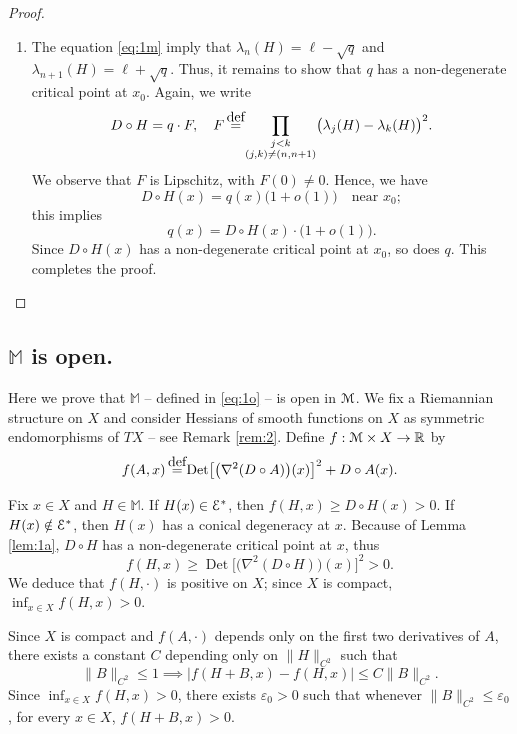 \documentclass[11pt]{article}
\numberwithin{equation}{section}
\let\pazocal\EuScript
\theoremstyle{definition}
\DeclareMathOperator{\Det}{Det}
\newcommand{\EE}{\pazocal{E}}
\newcommand{\MM}{\pazocal{M}}
\newcommand{\R}{\mathbb{R}}
\newcommand{\Mm}{\mathbb{M}}
\let\epsi\varepsilon
\newcommand{\de}{\,\mathrel{\stackrel{\makebox[0pt]{\mbox{\normalfont\tiny def}}}{=}}}
\begin{document}
\begin{proof}
\begin{enumerate}
\item
The equation \eqref{eq:1m} imply that $\lambda_n(H) = \ell - \sqrt{q}$ and $\lambda_{n+1}(H) = \ell + \sqrt{q}$. Thus, it remains to show that $q$ has a non-degenerate critical point at $x_0$. Again, we write
\begin{equation*}
D \circ H = q \cdot F, \quad F \de \prod_{\substack{j < k \\ (j,k) \neq (n,n+1)}} \bigl(\lambda_j(H)-\lambda_k(H)\bigr)^2.
\end{equation*}
We observe that $F$ is Lipschitz, with $F(0) \neq 0$. Hence, we have
\[
D \circ H(x) = q(x) \bigl(1 + o(1)\bigr)\quad \text{near }x_0;
\]
this implies
\begin{equation*}
q(x) = D \circ H(x) \cdot \bigl( 1 + o(1) \bigr).
\end{equation*}
Since $D \circ H(x)$ has a non-degenerate critical point at $x_0$, so does $q$. This completes the proof.\qedhere
\end{enumerate}
\end{proof}

\subsection{$\Mm$ is open.}\label{sec:2.2} Here we prove that $\Mm$ -- defined in \eqref{eq:1o} -- is open in $\MM$. We fix a Riemannian structure on $X$ and consider Hessians of smooth functions on $X$ as symmetric endomorphisms of $TX$ -- see Remark \ref{rem:2}. Define $f : \MM \times X \to \R$ by
\begin{equation}\label{eq:0j}
f(A,x) \de \Det\bigl[ \bigl(\nabla^2 (D\circ A)\bigr)(x) \bigr]^2 + D \circ A(x).
\end{equation}

Fix $x \in X$ and $H \in \Mm$. If $H(x) \in \EE^*$, then $f(H,x) \geq D \circ H(x) > 0$. If $H(x) \notin \EE^*$, then $H(x)$ has a conical degeneracy at $x$. Because of Lemma \ref{lem:1a}, $D \circ H$ has a non-degenerate critical point at $x$, thus
\begin{equation*}
f(H,x) \geq \Det\bigl[ \bigl(\nabla^2 (D\circ H)\bigr)(x) \bigr]^2 > 0.
\end{equation*}
We deduce that $f(H,\cdot)$ is positive on $X$; since $X$ is compact, $\inf_{x \in X} f(H,x) > 0$.

Since $X$ is compact and $f(A,\cdot)$ depends only on the first two derivatives of $A$, there exists a constant $C$ depending only on $\| H \|_{C^2}$ such that
\begin{equation}\label{eq:0m}
\|B \|_{C^2} \leq 1 \implies
\big|f(H+B,x) - f(H,x)\big| \leq C \|B\|_{C^2}.
\end{equation}
Since $\inf_{x \in X} f(H,x) > 0$, there exists $\epsi_0 > 0$ such that whenever $\| B \|_{C^2} \leq \epsi_0$, for every $x \in X$, $f(H+B,x) > 0$.
\end{document}
